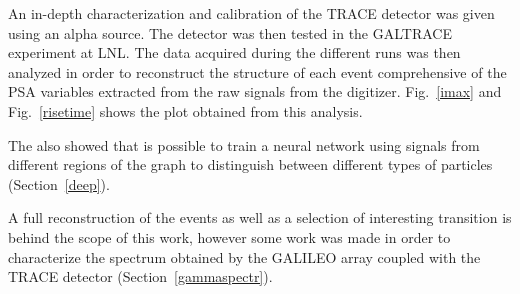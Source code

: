 An in-depth characterization and calibration of the TRACE detector was given using an alpha source. The detector was then tested in the GALTRACE experiment at LNL. The data acquired during the different runs was then analyzed in order to reconstruct the structure of each event comprehensive of the PSA variables extracted from the raw signals from the digitizer. Fig.~\ref{imax} and Fig.~\ref{risetime} shows the plot obtained from this analysis.


The also showed that is possible to train a neural network using signals from different regions of the graph to distinguish between different types of particles (Section~\ref{deep}).


A full reconstruction of the events as well as a selection of interesting transition is behind the scope of this work, however some work was made in order to characterize the spectrum obtained by the GALILEO array coupled with the TRACE detector (Section~\ref{gammaspectr}).

